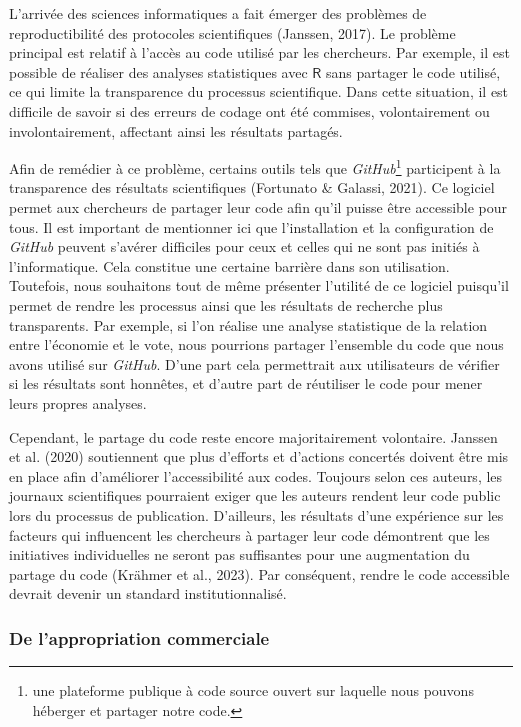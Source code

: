 \documentclass[
  letterpaper,
  DIV=11,
  numbers=noendperiod,
  oneside]{scrreprt}
\begin{document}
L'arrivée des sciences informatiques a fait émerger des problèmes de
reproductibilité des protocoles scientifiques (Janssen, 2017). Le
problème principal est relatif à l'accès au code utilisé par les
chercheurs. Par exemple, il est possible de réaliser des analyses
statistiques avec \(\textsf{R}\) sans partager le code utilisé, ce qui
limite la transparence du processus scientifique. Dans cette situation,
il est difficile de savoir si des erreurs de codage ont été commises,
volontairement ou involontairement, affectant ainsi les résultats
partagés.

Afin de remédier à ce problème, certains outils tels que
\emph{GitHub}\footnote{une plateforme publique à code source ouvert sur
  laquelle nous pouvons héberger et partager notre code.} participent à
la transparence des résultats scientifiques (Fortunato \& Galassi,
2021). Ce logiciel permet aux chercheurs de partager leur code afin
qu'il puisse être accessible pour tous. Il est important de mentionner
ici que l'installation et la configuration de \emph{GitHub} peuvent
s'avérer difficiles pour ceux et celles qui ne sont pas initiés à
l'informatique. Cela constitue une certaine barrière dans son
utilisation. Toutefois, nous souhaitons tout de même présenter l'utilité
de ce logiciel puisqu'il permet de rendre les processus ainsi que les
résultats de recherche plus transparents. Par exemple, si l'on réalise
une analyse statistique de la relation entre l'économie et le vote, nous
pourrions partager l'ensemble du code que nous avons utilisé sur
\emph{GitHub}. D'une part cela permettrait aux utilisateurs de vérifier
si les résultats sont honnêtes, et d'autre part de réutiliser le code
pour mener leurs propres analyses.

Cependant, le partage du code reste encore majoritairement volontaire.
Janssen et al. (2020) soutiennent que plus d'efforts et d'actions
concertés doivent être mis en place afin d'améliorer l'accessibilité aux
codes. Toujours selon ces auteurs, les journaux scientifiques pourraient
exiger que les auteurs rendent leur code public lors du processus de
publication. D'ailleurs, les résultats d'une expérience sur les facteurs
qui influencent les chercheurs à partager leur code démontrent que les
initiatives individuelles ne seront pas suffisantes pour une
augmentation du partage du code (Krähmer et al., 2023). Par conséquent,
rendre le code accessible devrait devenir un standard institutionnalisé.

\hypertarget{de-lappropriation-commerciale}{%
\subsubsection{De l'appropriation
commerciale}\label{de-lappropriation-commerciale}}
\end{document}
